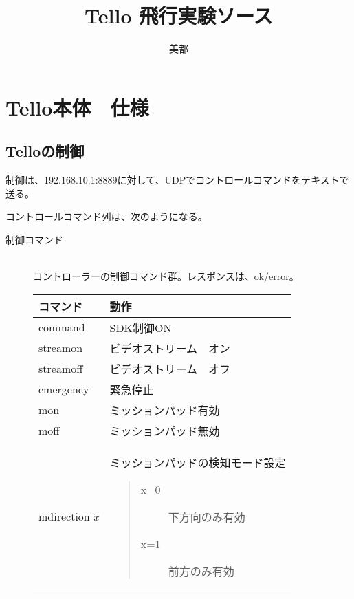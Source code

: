 \documentclass[a4paper, 12pt]{ltjsarticle}
\title{Tello 飛行実験ソース}
\author{美都}
\begin{document}
\maketitle
\tableofcontents
\clearpage

\section {Tello本体　仕様}
\subsection {Telloの制御}
制御は、192.168.10.1:8889に対して、UDPでコントロールコマンドをテキストで送る。

コントロールコマンド列は、次のようになる。
\begin{description}
    \item[制御コマンド]\mbox{}\\
        コントローラーの制御コマンド群。レスポンスは、ok/error。
        \begin{table}[h]
            \hspace{3\zw}
            \begin{tabular}{ll}
                \hline
                コマンド & 動作 \\
                \hline \hline
                command & SDK制御ON \\ \hline
                streamon & ビデオストリーム　オン \\ \hline
                streamoff & ビデオストリーム　オフ \\ \hline
                emergency & 緊急停止 \\ \hline
                mon & ミッションパッド有効 \\ \hline
                moff & ミッションパッド無効 \\ \hline
                mdirection \emph{x} & 
                    \begin{minipage}{0.45\textwidth}
                        \vspace{0.5\zh}
                        ミッションパッドの検知モード設定
                        \vspace{-1\zh}
                        \begin{quote}
                            \begin{description}
                                \item[x=0]下方向のみ有効
                                \item[x=1]前方のみ有効

\end{description}
\end{quote}
\end{minipage}
\end{tabular}
\end{table}
\end{description}
\end{document}
